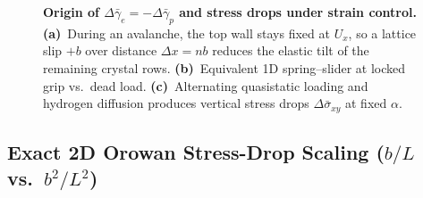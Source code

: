 \documentclass[11pt,a4paper]{article}
\newcommand{\code}[1]{\texttt{#1}}
\newcommand{\dsigbar}{\Delta\bar{\sigma}_{xy}}
\begin{document}
\begin{figure}[ht!]
{%
}
\caption{\textbf{Origin of $\Delta\bar{\gamma}_e = -\Delta\bar{\gamma}_p$ and stress drops under strain control.} \textbf{(a)}~During an avalanche, the top wall stays fixed at $U_x$, so a lattice slip $+b$ over distance $\Delta x = n b$ reduces the elastic tilt of the remaining crystal rows. \textbf{(b)}~Equivalent 1D spring--slider at locked grip vs.\ dead load. \textbf{(c)}~Alternating quasistatic loading and hydrogen diffusion produces vertical stress drops $\dsigbar$ at fixed $\alpha$.}
\label{fig:strain_control}
\end{figure}

\subsection{Exact 2D Orowan Stress-Drop Scaling (\texorpdfstring{$b/L$}{b/L} vs.\ \texorpdfstring{$b^2/L^2$}{b\textasciicircum 2/L\textasciicircum 2})}
\end{document}

